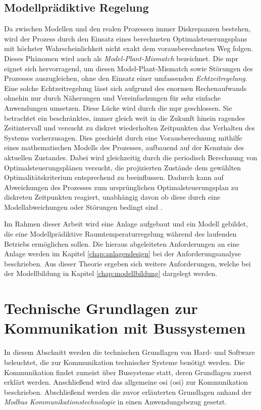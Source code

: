 \subsection{Modellprädiktive Regelung}

Da zwischen Modellen und den realen Prozessen immer Diskrepanzen bestehen, wird der Prozess durch den Einsatz eines berechneten Optimalsteuerungsplans mit höchster Wahrscheinlichkeit nicht exakt dem vorausberechneten Weg folgen. Dieses Phänomen wird auch als \textit{Model-Plant-Mismatch} bezeichnet. Die \acrlong{mpr} eignet sich hervorragend, um diesen Model-Plant-Mismatch sowie Störungen des Prozesses auszugleichen, ohne den Einsatz einer umfassenden \textit{Echtzeitregelung}. Eine solche Echtzeitregelung lässt sich aufgrund des enormen Rechenaufwands ohnehin nur durch Näherungen und Vereinfachungen für sehr einfache Anwendungen umsetzen. Diese Lücke wird durch die \acrlong{mpr} geschlossen. Sie betrachtet ein beschränktes, immer gleich weit in die Zukunft hinein ragendes Zeitintervall und versucht zu diskret wiederholten Zeitpunkten das Verhalten des Systems vorherzusagen. Dies geschieht durch eine Vorausberechnung mithilfe eines mathematischen Modells des Prozesses, aufbauend auf der Kenntnis des aktuellen Zustandes. Dabei wird gleichzeitig durch die periodisch Berechnung von Optimalsteuerungsplänen versucht, die projizierten Zustände dem gewählten Optimalitätskriterium entsprechend zu beeinflussen. Dadurch kann auf Abweichungen des Prozesses zum ursprünglichen Optimalsteuerungsplan zu diskreten Zeitpunkten reagiert, unabhängig davon ob diese durch eine Modellabweichungen oder Störungen bedingt sind \cite[S.~71]{di14}.

Im Rahmen dieser Arbeit wird eine Anlage aufgebaut und ein Modell gebildet, die eine Modellprädiktive Raumtemperaturregelung während des laufenden Betriebs ermöglichen sollen. 
Die hieraus abgeleiteten Anforderungen an eine Anlage werden im Kapitel \ref{chap:anlagendesign} bei der Anforderungsanalyse beschrieben.
Aus dieser Theorie ergeben sich weitere Anforderungen, welche bei der Modellbildung in Kapitel \ref{chap:modellbildung} dargelegt werden.


\section{Technische Grundlagen zur Kommunikation mit Bussystemen}
\label{sec:grundlagenbus}

In diesem Abschnitt werden die technischen Grundlagen von Hard- und Software beleuchtet, die zur Kommunikation technischer Systeme benötigt werden. Die Kommunikation findet zumeist über Bussysteme statt, deren Grundlagen zuerst erklärt werden. Anschließend wird das allgemeine \acrlong{osi} (\acrshort{osi}) zur Kommunikation beschrieben. Abschließend werden die zuvor erläuterten Grundlagen anhand der \textit{Modbus Kommunikationstechnologie} in einen Anwendungsbezug gesetzt.

